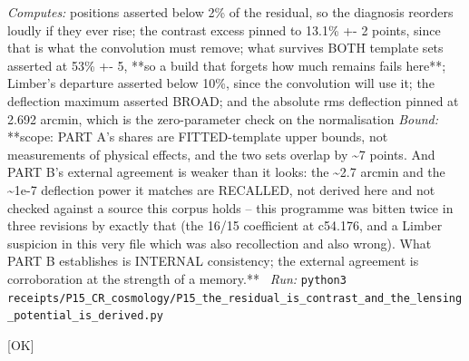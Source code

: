 \begin{description}
\emph{Computes:} positions asserted below 2\% of the residual, so the diagnosis reorders loudly if they ever rise; the contrast excess pinned to 13.1\% +- 2 points, since that is what the convolution must remove; what survives BOTH template sets asserted at 53\% +- 5, **so a build that forgets how much remains fails here**; Limber's departure asserted below 10\%, since the convolution will use it; the deflection maximum asserted BROAD; and the absolute rms deflection pinned at 2.692 arcmin, which is the zero-parameter check on the normalisation
 \emph{Bound:} **scope: PART A's shares are FITTED-template upper bounds, not measurements of physical effects, and the two sets overlap by \textasciitilde{}7 points. And PART B's external agreement is weaker than it looks: the \textasciitilde{}2.7 arcmin and the \textasciitilde{}1e-7 deflection power it matches are RECALLED, not derived here and not checked against a source this corpus holds -- this programme was bitten twice in three revisions by exactly that (the 16/15 coefficient at c54.176, and a Limber suspicion in this very file which was also recollection and also wrong). What PART B establishes is INTERNAL consistency; the external agreement is corroboration at the strength of a memory.**
\ \emph{Run:} \texttt{python3 receipts/P15\_CR\_cosmology/P15\_the\_residual\_is\_contrast\_and\_the\_lensing\_potential\_is\_derived.py}
\item[\rcptlabel{P15_the_phase_is_the_driving_and_the_undriven_arms_agree}{P15R77}\textbf{P15R77}\quad\texttt{P15\_the\_phase\_is\_the\_driving\_and\_the\_undriven\_arms\_agree}]\hfill\textsf{[OK]}\\

\end{description}
